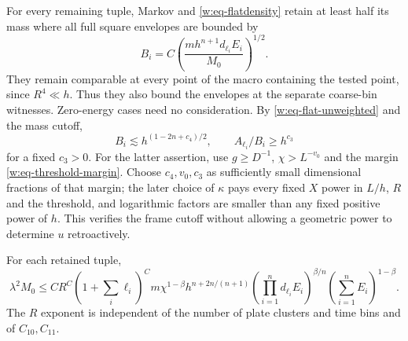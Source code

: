 For every remaining tuple, Markov and \eqref{w:eq-flatdensity} retain
at least half its mass where all full square envelopes are bounded by
\begin{equation}\label{w:eq-Bi}
 B_i=C\left(\frac{mh^{n+1}d_{\ell_i}E_i}{M_0}\right)^{1/2}.
\end{equation}
They remain comparable at every point of the macro containing the
tested point, since $R^4\ll h$.  Thus they also bound the envelopes
at the separate coarse-bin witnesses.  Zero-energy cases need no
consideration.  By \eqref{w:eq-flat-unweighted} and the mass cutoff,
\begin{equation}\label{w:eq-framecutoff}
 B_i\lesssim h^{(1-2n+c_4)/2},\qquad A_{\ell_i}/B_i\geq h^{c_3}
\end{equation}
for a fixed $c_3>0$.  For the latter assertion, use
$g\geq D^{-1}$, $\chi>L^{-v_0}$ and the margin
\eqref{w:eq-threshold-margin}.  Choose $c_4,v_0,c_3$ as sufficiently
small dimensional fractions of that margin; the later choice of
$\kappa$ pays every fixed $X$ power in $L/h$, $R$ and the threshold,
and logarithmic factors are smaller than any fixed positive power of
$h$.  This verifies the frame cutoff without allowing a geometric
power to determine $u$ retroactively.

\begin{lemma}\label{w:tuple}
For each retained tuple,
\begin{equation}\label{w:eq-tuple}
 \lambda^2 M_0\leq CR^C(1+\textstyle\sum_i\ell_i)^C
 m\chi^{1-\beta}h^{n+2n/(n+1)}
 \left(\prod_{i=1}^n d_{\ell_i}E_i\right)^{\beta/n}
 \left(\sum_{i=1}^nE_i\right)^{1-\beta}.
\end{equation}
The $R$ exponent is independent of the number of plate clusters and
time bins and of $C_{10},C_{11}$.
\end{lemma}

